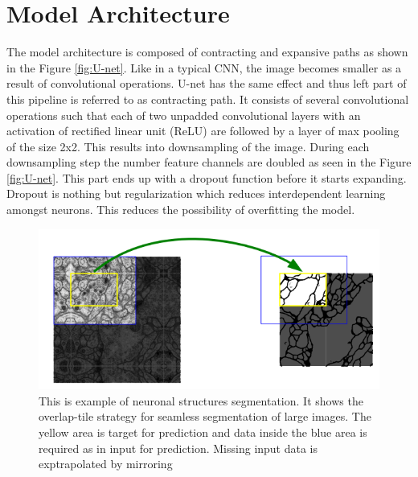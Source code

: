 \documentclass[11pt]{article}
\begin{document}
\section{Model Architecture}
The model architecture is composed of contracting and expansive paths as shown in the Figure \ref{fig:U-net}. Like in a typical CNN, the image becomes smaller as a result of convolutional operations. U-net has the same effect and thus left part of this pipeline is referred to as contracting path. It consists of several convolutional operations such that each of two unpadded convolutional layers with an activation of rectified linear unit (ReLU) are followed by a layer of max pooling of the size 2x2. This results into downsampling of the image. During each downsampling step the number feature channels are doubled as seen in the Figure \ref{fig:U-net}. This part ends up with a dropout function before it starts expanding. Dropout is nothing but regularization which reduces interdependent learning amongst neurons. This reduces the possibility of overfitting the model.

\begin{figure}[H]
	\includegraphics[width=\linewidth]{files/unet/tile.png}
	\caption{This is example of neuronal structures segmentation. It shows the overlap-tile strategy for seamless segmentation of large images. The yellow area is target for prediction and data inside the blue area is required as in input for prediction. Missing input data is exptrapolated by mirroring}
	\label{fig:tiling}
\end{figure} 
\end{document}
